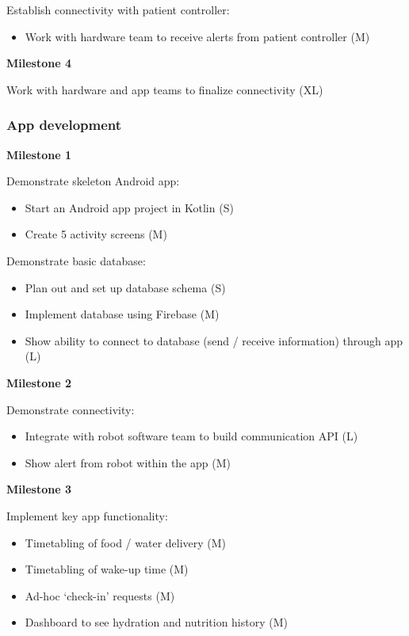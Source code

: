\documentclass{article}
\begin{document}
Establish connectivity with patient controller:
\begin{itemize}
\item Work with hardware team to receive alerts from patient controller (M)
\end{itemize}

{\bf Milestone 4}

Work with hardware and app teams to finalize connectivity (XL)


\subsubsection{App development}

{\bf Milestone 1}

Demonstrate skeleton Android app:
\begin{itemize}
\item Start an Android app project in Kotlin (S)
\item Create 5 activity screens (M)
\end{itemize}

Demonstrate basic database:
\begin{itemize}
\item Plan out and set up database schema (S)
\item Implement database using Firebase (M)
\item Show ability to connect to database (send / receive information) through app (L)
\end{itemize}

{\bf Milestone 2}

Demonstrate connectivity:
\begin{itemize}
\item Integrate with robot software team to build communication API (L)
\item Show alert from robot within the app (M)
\end{itemize}

{\bf Milestone 3}

Implement key app functionality:
\begin{itemize}
\item Timetabling of food / water delivery (M)
\item Timetabling of wake-up time (M)
\item Ad-hoc `check-in' requests (M)
\item Dashboard to see hydration and nutrition history (M)
\end{itemize}
\end{document}
